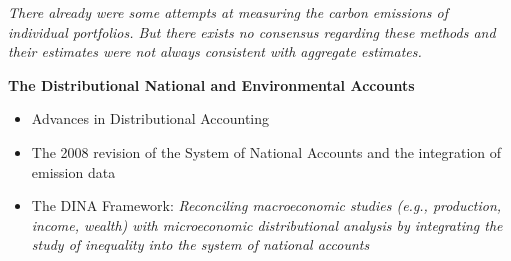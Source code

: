 \documentclass[10pt]{beamer}
\begin{document}
\begin{frame}

\textit{There already were some attempts at measuring the carbon emissions of individual portfolios. But there exists no consensus regarding these methods and their estimates were not always consistent with aggregate estimates.}
\vspace{10pt}

\textbf{The Distributional National and Environmental Accounts}

\begin{itemize}
    \item Advances in Distributional Accounting
    \item The 2008 revision of the System of National Accounts and the integration of emission data
    \item The DINA Framework: \textit{Reconciling macroeconomic studies (e.g., production, income, wealth) with microeconomic distributional analysis by integrating the study of inequality into the system of national accounts}
\end{itemize}

\end{frame}



\end{document}
